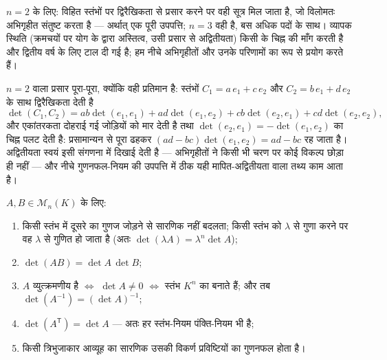 \begin{remark}
$n = 2$ के लिए: विहित स्तंभों पर द्विरैखिकता से प्रसार करने पर वही सूत्र मिल
जाता है, जो विलोमतः अभिगृहीत संतुष्ट करता है --- अर्थात् एक पूरी उपपत्ति; $n
= 3$ वही है, बस अधिक पदों के साथ। व्यापक स्थिति (क्रमचयों पर योग के द्वारा
अस्तित्व, उसी प्रसार से अद्वितीयता) किसी  के चिह्न की माँग करती है और
द्वितीय वर्ष के लिए टाल दी गई है; हम नीचे अभिगृहीतों और उनके परिणामों का
 रूप से प्रयोग करते हैं।

$n = 2$ वाला प्रसार पूरा-पूरा, क्योंकि वही प्रतिमान है: स्तंभों $C_1 =
a\,e_1 + c\,e_2$ और $C_2 = b\,e_1 + d\,e_2$ के साथ द्विरैखिकता देती है
\[
\det(C_1, C_2) = ab\det(e_1, e_1) + ad\det(e_1, e_2)
+ cb\det(e_2, e_1) + cd\det(e_2, e_2),
\]
और एकांतरकता दोहराई गई जोड़ियों को मार देती है तथा $\det(e_2, e_1) =
-\det(e_1, e_2)$ का चिह्न पलट देती है: प्रसामान्यन से पूरा  ढहकर
$(ad - bc)\det(e_1, e_2) = ad - bc$ रह जाता है। अद्वितीयता स्वयं इसी संगणना
में दिखाई देती है --- अभिगृहीतों ने किसी भी चरण पर कोई विकल्प छोड़ा ही नहीं
--- और नीचे गुणनफल-नियम की उपपत्ति में ठीक यही मापित-अद्वितीयता वाला तथ्य
काम आता है।
\end{remark}

\begin{theorem}[गुण]\label{thm:b1:det:props}
$A, B \in \mathcal{M}_n(K)$ के लिए:
\begin{enumerate}
  \item किसी स्तंभ में दूसरे का गुणज जोड़ने से सारणिक नहीं बदलता; किसी स्तंभ
  को $\lambda$ से गुणा करने पर वह $\lambda$ से गुणित हो जाता है (अतः
  $\det(\lambda A) = \lambda^n \det A$);
  \item $\det(AB) = \det A\, \det B$;
  \item $A$ व्युत्क्रमणीय है $\iff$ $\det A \neq 0$ $\iff$ स्तंभ $K^n$ का
   बनाते हैं; और तब $\det(A^{-1}) = (\det A)^{-1}$;
  \item $\det(A^{\mathsf T}) = \det A$ --- अतः हर स्तंभ-नियम पंक्ति-नियम भी
  है;
  \item किसी त्रिभुजाकार आव्यूह का सारणिक उसकी विकर्ण प्रविष्टियों का गुणनफल
  होता है।
\end{enumerate}
\end{theorem}

